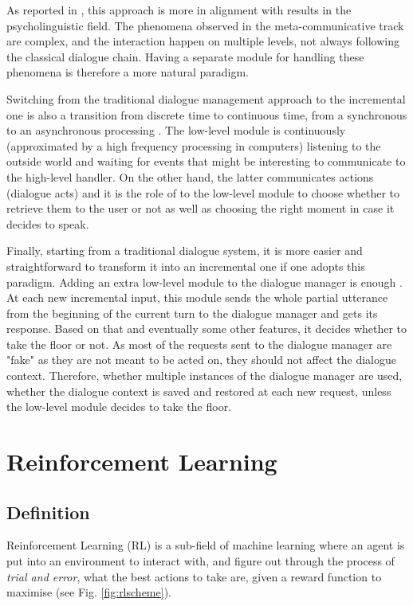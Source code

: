 				As reported in \cite{Lemon2003}, this approach is more in alignment with results in the psycholinguistic field. The phenomena observed in the meta-communicative track are complex, and the interaction happen on multiple levels, not always following the classical dialogue chain. Having a separate module for handling these phenomena is therefore a more natural paradigm.
				
				Switching from the traditional dialogue management approach to the incremental one is also a transition from discrete time to continuous time, from a synchronous to an asynchronous processing \cite{Raux2007}. The low-level module is continuously (approximated by a high frequency processing in computers) listening to the outside world and waiting for events that might be interesting to communicate to the high-level handler. On the other hand, the latter communicates actions (dialogue acts) and it is the role of to the low-level module to choose whether to retrieve them to the user or not as well as choosing the right moment in case it decides to speak.
				
				Finally, starting from a traditional dialogue system, it is more easier and straightforward to transform it into an incremental one if one adopts this paradigm. Adding an extra low-level module to the dialogue manager is enough \cite{Selfridge2012a,Khouzaimi2014a}. At each new incremental input, this module sends the whole partial utterance from the beginning of the current turn to the dialogue manager and gets its response. Based on that and eventually some other features, it decides whether to take the floor or not. As most of the requests sent to the dialogue manager are "fake" as they are not meant to be acted on, they should not affect the dialogue context. Therefore, whether multiple instances of the dialogue manager are used, whether the dialogue context is saved and restored at each new request, unless the low-level module decides to take the floor.

\section{Reinforcement Learning}
	\subsection{Definition}
    
    	Reinforcement Learning (RL) is a sub-field of machine learning where an agent is put into an environment to interact with, and figure out through the process of \textit{trial and error}, what the best actions to take are, given a reward function to maximise \cite{Sutton1998} (see Fig. \ref{fig:rlscheme}).
        
